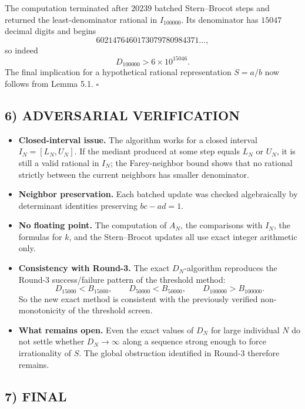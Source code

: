 The computation terminated after $20239$ batched Stern--Brocot steps and returned the least-denominator rational in $I_{100000}$. Its denominator has $15047$ decimal digits and begins
\[
6021476460173079780984371\ldots,
\]
so indeed
\[
D_{100000}>6\times 10^{15046}.
\]
The final implication for a hypothetical rational representation $S=a/b$ now follows from Lemma 5.1. \hfill$\square$

\subsection*{6) ADVERSARIAL VERIFICATION}

\begin{itemize}
\item \textbf{Closed-interval issue.} The algorithm works for a closed interval $I_N=[L_N,U_N]$. If the mediant produced at some step equals $L_N$ or $U_N$, it is still a valid rational in $I_N$; the Farey-neighbor bound shows that no rational strictly between the current neighbors has smaller denominator.

\item \textbf{Neighbor preservation.} Each batched update was checked algebraically by determinant identities preserving $bc-ad=1$.

\item \textbf{No floating point.} The computation of $A_N$, the comparisons with $I_N$, the formulas for $k$, and the Stern--Brocot updates all use exact integer arithmetic only.

\item \textbf{Consistency with Round-3.} The exact $D_N$-algorithm reproduces the Round-3 success/failure pattern of the threshold method:
\[
D_{15000}<B_{15000},\qquad D_{50000}<B_{50000},\qquad D_{100000}>B_{100000}.
\]
So the new exact method is consistent with the previously verified non-monotonicity of the threshold screen.

\item \textbf{What remains open.} Even the exact values of $D_N$ for large individual $N$ do not settle whether $D_N\to\infty$ along a sequence strong enough to force irrationality of $S$. The global obstruction identified in Round-3 therefore remains.
\end{itemize}

\subsection*{7) FINAL}


